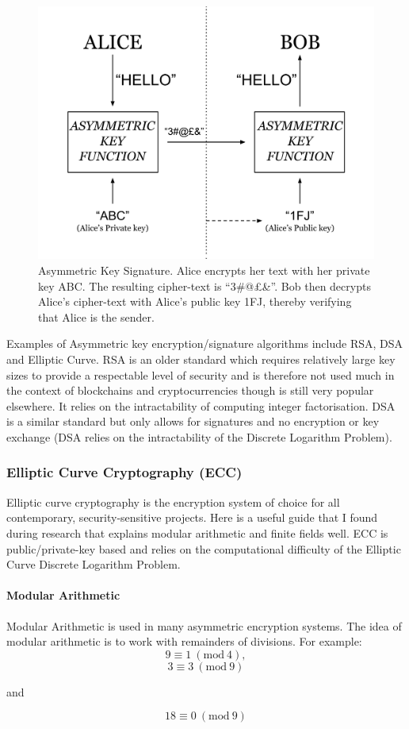 \documentclass{article}
\begin{document}
\begin{figure}[H]
    \centering
    \includegraphics[width=0.6\linewidth]{Images/Diagrams/asymmetric_key_signature.png}
    \caption{Asymmetric Key Signature. Alice encrypts her text with her private key ABC. The resulting cipher-text is ``3\#@£\&''. Bob then decrypts Alice's cipher-text with Alice's public key 1FJ, thereby verifying that Alice is the sender.}
    \label{fig:asymkeysig}
\end{figure}

Examples of Asymmetric key encryption/signature algorithms include RSA, DSA and Elliptic Curve. RSA is an older standard which requires relatively large key sizes to provide a respectable level of security and is therefore not used much in the context of blockchains and cryptocurrencies though is still very popular elsewhere. It relies on the intractability of computing integer factorisation. DSA is a similar standard but only allows for signatures and no encryption or key exchange (DSA relies on the intractability of the Discrete Logarithm Problem).

\subsubsection{Elliptic Curve Cryptography (ECC)}
Elliptic curve cryptography is the encryption system of choice for all contemporary, security-sensitive projects. Here\cite{ic_encryption_course} is a useful guide that I found during research that explains modular arithmetic and finite fields well. ECC is public/private-key based and relies on the computational difficulty of the Elliptic Curve Discrete Logarithm Problem.

\paragraph{Modular Arithmetic}
Modular Arithmetic is used in many asymmetric encryption systems. The idea of modular arithmetic is to work with remainders of divisions. For example: \[9 \equiv 1\ (\textrm{mod}\ 4),\]\[3 \equiv 3\ (\textrm{mod}\ 9)\]{\centering and \par}\[18 \equiv 0\ (\textrm{mod}\ 9)\]
\end{document}
